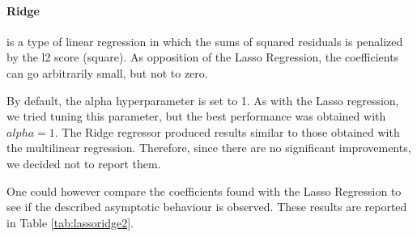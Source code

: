 \documentclass[10pt, a4paper, twocolumn]{article}
\begin{document}
\begin{table}[t]
    \centering
\end{table}

\paragraph{Ridge} is a type of linear regression in which the sums of squared residuals is penalized by the l2 score (square). As opposition of the Lasso Regression, the coefficients can go arbitrarily small, but not to zero.

By default, the alpha hyperparameter is set to 1. As with the Lasso regression, we tried tuning this parameter, but the best performance was obtained with $alpha=1$. The Ridge regressor produced results similar to those obtained with the multilinear regression. Therefore, since there are no significant improvements, we decided not to report them.

One could however compare the coefficients found with the Lasso Regression to see if the described asymptotic behaviour is observed. These results are reported in Table \ref{tab:lassoridge2}. 
\end{document}
